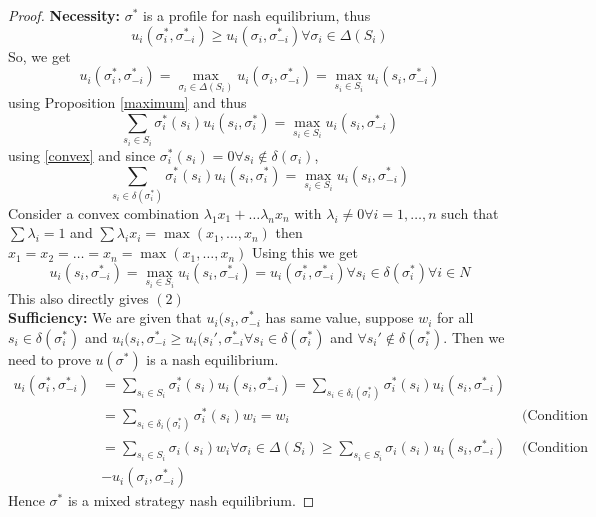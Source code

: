\documentclass{article}
\theoremstyle{definition}
\begin{document}
\begin{proof}
\textbf{Necessity:} $\sigma^*$ is a profile for nash equilibrium, thus $$u_i(\sigma_i^*, \sigma_{-i}^*)\geq u_i(\sigma_i, \sigma_{-i}^*) \forall \sigma_i \in \Delta(S_i)$$ So, we get $$u_i(\sigma_i^*, \sigma_{-i}^*) = \max_{\sigma_i\in \Delta(S_i)} u_i(\sigma_i, \sigma_{-i}^*) = \max_{s_i\in S_i}u_i(s_i, \sigma_{-i}^*)$$ using Proposition \ref{maximum} and thus $$\sum_{s_i \in S_i} \sigma_i^*(s_i)u_i(s_i,\sigma_i^*) = \max_{s_i\in S_i}u_i(s_i, \sigma_{-i}^*)$$ using \ref{convex} and since $\sigma_i^*(s_i) = 0 \forall s_i\notin \delta(\sigma_i)$, $$\sum_{s_i \in \delta(\sigma_i^*)} \sigma_i^*(s_i)u_i(s_i,\sigma_i^*) = \max_{s_i\in S_i}u_i(s_i, \sigma_{-i}^*)$$ Consider a convex combination $\lambda_1x_1 +\dots \lambda_nx_n$ with $\lambda_i \neq 0 \forall i = 1, \dots,n$ such that $\sum \lambda_i =1$ and $\sum \lambda_ix_i = \max(x_1, \dots, x_n)$ then $x_1 = x_2 = \dots = x_n = \max(x_1, \dots, x_n)$ Using this we get $$u_i(s_i, \sigma_{-i}^*) = \max_{s_i\in S_i}u_i(s_i, \sigma_{-i}^*)= u_i(\sigma_i^*, \sigma_{-i}^*) \forall s_i \in \delta(\sigma_i^*) \forall i \in N$$ This also directly gives $(2)$\\

\textbf{Sufficiency:} We are given that $u_i(s_i,\sigma_{-i}^*$ has same value, suppose $w_i$ for all $s_i\in \delta(\sigma_i^*)$ and $u_i(s_i,\sigma_{-i}^* \geq u_i(s_i',\sigma_{-i}^* \forall s_i \in \delta(\sigma_i^*)$ and $\forall s_i' \notin \delta(\sigma_i^*)$. Then we need to prove $u(\sigma^*)$ is a nash equilibrium.
\begin{align*}
u_i(\sigma_i^*, \sigma_{-i}^*) &= \sum_{s_i \in S_i} \sigma_i^*(s_i)u_i(s_i,\sigma_{-i}^*)  = \sum_{s_i \in \delta_i(\sigma_i^*)} \sigma_i^*(s_i)u_i(s_i,\sigma_{-i}^*)\\
&= \sum_{s_i \in \delta_i(\sigma_i^*)} \sigma_i^*(s_i) w_i = w_i &\text{ (Condition 1)}\\
&= \sum_{s_i\in S_i} \sigma_i(s_i)w_i \forall \sigma_i\in \Delta(S_i) \geq \sum_{s_i \in S_i} \sigma_i(s_i)u_i(s_i,\sigma_{-i}^*) &\text{ (Condition 2)}\\
&- u_i(\sigma_i, \sigma_{-i}^*)
\end{align*}
Hence $\sigma^*$ is a mixed strategy nash equilibrium.
\end{proof}
\end{document}

